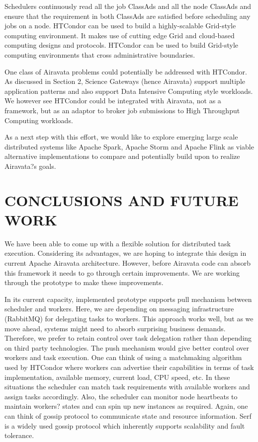 \documentclass[review]{elsarticle}
\begin{document}
Schedulers continuously read all the job ClassAds and all the node ClassAds and ensure that the requirement in both ClassAds are satisfied before scheduling any jobs on a node. HTCondor can be used to build a highly-scalable Grid-style computing environment.  It makes use of cutting edge Grid and cloud-based computing designs and protocols. HTCondor can be used to build Grid-style computing environments that cross administrative boundaries. 

One class of Airavata problems could potentially be addressed with HTCondor. As discussed in Section 2,  Science Gateways (hence Airavata) support multiple application patterns and also support Data Intensive Computing style workloads. We however see HTCondor could be integrated with Airavata, not as a framework, but as an adaptor to broker job submissions to High Throughput Computing workloads.   

As a next step with this effort, we would like to explore emerging large scale distributed systems like Apache Spark, Apache Storm and Apache Flink as viable alternative implementations to compare and potentially build upon to realize Airavata?s goals. 


\section{CONCLUSIONS AND FUTURE WORK}
We have been able to come up with a flexible solution for distributed task execution. Considering its advantages, we are hoping to integrate this design in current Apache Airavata architecture. However, before Airavata code can absorb this framework it needs to go through certain improvements. We are working through the prototype to make these improvements. 

In its current capacity, implemented prototype supports pull mechanism between scheduler and workers. Here, we are depending on messaging infrastructure (RabbitMQ) for delegating tasks to workers. This approach works well, but as we move ahead, systems might need to absorb surprising business demands.  Therefore, we prefer to retain control over task delegation rather than depending on third party technologies. The push mechanism would give better control over workers and task execution. One can think of using a matchmaking algorithm used by HTCondor where workers can advertise their capabilities in terms of task implementation, available memory, current load, CPU speed, etc.  In these situations the scheduler can match task requirements with available workers and assign tasks accordingly. Also, the scheduler can monitor node heartbeats to maintain workers? states and can spin up new instances as required. Again, one can think of gossip protocol to communicate state and resource information. Serf is a widely used gossip protocol which inherently supports scalability and fault tolerance. 
\end{document}
